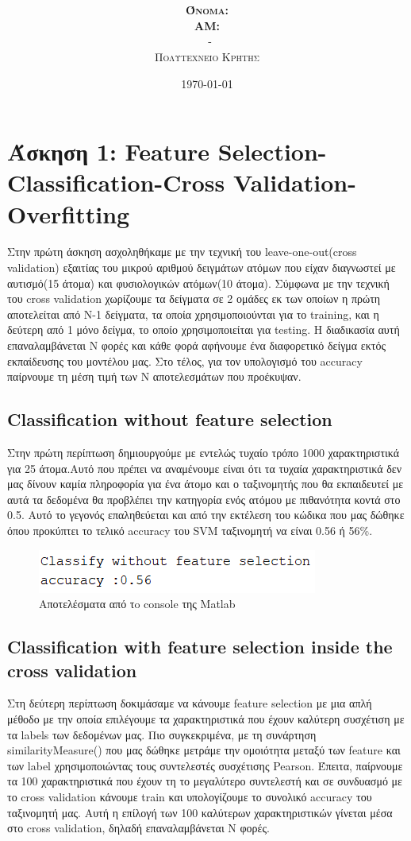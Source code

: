 \documentclass{article}
\title{\underline{\textbf{\assignmentNumber}}}
\author{\textsc{\textbf{Όνομα:}}  \studentName\\
		\textsc{\textbf{ΑΜ:}}  \studentNumber\\
		\course \ - \courseName\\ 
		\textsc{Πολυτεχνείο Κρήτης}
}
\date{\today}
\begin{document}
	\maketitle
\section*{Άσκηση 1: Feature Selection-Classification-Cross Validation-Overfitting}
	Στην πρώτη άσκηση ασχοληθήκαμε με την τεχνική του leave-one-out(cross validation) εξαιτίας του μικρού αριθμού δειγμάτων ατόμων που είχαν διαγνωστεί με αυτισμό(15 άτομα) και φυσιολογικών ατόμων(10 άτομα). Σύμφωνα με την τεχνική του cross validation χωρίζουμε τα δείγματα σε 2 ομάδες εκ των οποίων η πρώτη αποτελείται από N-1 δείγματα, τα οποία χρησιμοποιούνται για το training, και η δεύτερη από 1 μόνο δείγμα, το οποίο χρησιμοποιείται για testing. H διαδικασία αυτή επαναλαμβάνεται Ν φορές και κάθε φορά αφήνουμε ένα διαφορετικό δείγμα εκτός εκπαίδευσης του μοντέλου μας. Στο τέλος, για τον υπολογισμό του accuracy παίρνουμε τη μέση τιμή των Ν αποτελεσμάτων που προέκυψαν.
	
\subsection*{Classification without feature selection}
	Στην πρώτη περίπτωση δημιουργούμε με εντελώς τυχαίο τρόπο 1000 χαρακτηριστικά για 25 άτομα.Αυτό που πρέπει να αναμένουμε είναι ότι τα τυχαία χαρακτηριστικά δεν μας δίνουν καμία πληροφορία για ένα	άτομο και ο ταξινομητής που θα εκπαιδευτεί με αυτά τα δεδομένα θα προβλέπει την κατηγορία ενός ατόμου	με πιθανότητα κοντά στο 0.5. Αυτό το γεγονός επαληθεύεται και από την εκτέλεση του κώδικα που μας δώθηκε όπου προκύπτει το τελικό accuracy του SVM ταξινομητή να είναι 0.56 ή 56\%.\\
	
	\begin{figure}[h!]
		\centering
		\includegraphics[width=0.4\linewidth]{../exercise3_1/images/classify_without_feature_selection.png}
		\caption{Αποτελέσματα από τo console της Matlab}
	\end{figure}
\subsection*{Classification with feature selection inside the cross validation}
	Στη δεύτερη περίπτωση δοκιμάσαμε να κάνουμε feature selection με μια απλή μέθοδο με την οποία επιλέγουμε τα χαρακτηριστικά που έχουν καλύτερη συσχέτιση με τα labels των δεδομένων μας. Πιο συγκεκριμένα, με τη συνάρτηση similarityMeasure() που μας δώθηκε μετράμε την ομοιότητα μεταξύ των feature και των label χρησιμοποιώντας τους συντελεστές συσχέτισης Pearson. Έπειτα, παίρνουμε τα 100 χαρακτηριστικά που έχουν τη το μεγαλύτερο συντελεστή και σε συνδυασμό με το cross validation κάνουμε train και υπολογίζουμε το συνολικό accuracy του ταξινομητή μας. Αυτή η επίλογή των 100 καλύτερων χαρακτηριστικών γίνεται μέσα στο cross validation, δηλαδή επαναλαμβάνεται Ν φορές. \\
	
\end{document}
